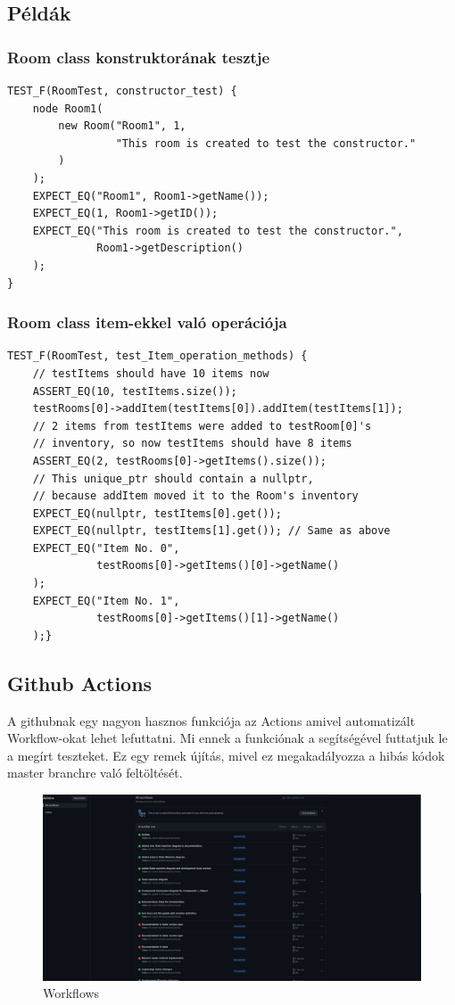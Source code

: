 \documentclass{scrarticle}
\begin{document}
\subsection{Példák}
\subsubsection{Room class konstruktorának tesztje}
\begin{lstlisting}
TEST_F(RoomTest, constructor_test) {
    node Room1(
        new Room("Room1", 1, 
                 "This room is created to test the constructor."
        )
    );
    EXPECT_EQ("Room1", Room1->getName());
    EXPECT_EQ(1, Room1->getID());
    EXPECT_EQ("This room is created to test the constructor.", 
              Room1->getDescription()
    );
}
\end{lstlisting}
\subsubsection{Room class item-ekkel való operációja}
\begin{lstlisting}
TEST_F(RoomTest, test_Item_operation_methods) {
    // testItems should have 10 items now
    ASSERT_EQ(10, testItems.size());
    testRooms[0]->addItem(testItems[0]).addItem(testItems[1]);
    // 2 items from testItems were added to testRoom[0]'s 
    // inventory, so now testItems should have 8 items
    ASSERT_EQ(2, testRooms[0]->getItems().size());
    // This unique_ptr should contain a nullptr, 
    // because addItem moved it to the Room's inventory
    EXPECT_EQ(nullptr, testItems[0].get()); 
    EXPECT_EQ(nullptr, testItems[1].get()); // Same as above
    EXPECT_EQ("Item No. 0", 
              testRooms[0]->getItems()[0]->getName()
    );
    EXPECT_EQ("Item No. 1", 
              testRooms[0]->getItems()[1]->getName()
    );}
\end{lstlisting}
\subsection{Github Actions}
A githubnak egy nagyon hasznos funkciója az Actions amivel automatizált Workflow-okat lehet lefuttatni. Mi ennek a funkciónak a segítségével futtatjuk le a megírt teszteket. Ez egy remek újítás, mivel ez megakadályozza a hibás kódok master branchre való feltöltését.
\begin{figure}[H]
    \includegraphics[width=1.0\columnwidth]{github_actions.png}
    \caption{Workflows}\label{fig:6}
\end{figure}
\newpage
\end{document}
